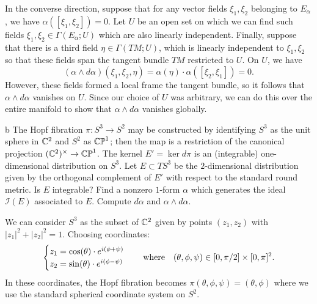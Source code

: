 \documentclass{../../templates/lkx_pset}
\begin{document}
\begin{parts}
	In the converse direction, suppose that for any vector fields $\xi_1,\xi_2$ belonging to $E_\alpha$, we have $\alpha([\xi_1,\xi_2])=0$. Let $U$ be an open set on which we can find such fields $\xi_1, \xi_2 \in \Gamma(E_\alpha; U)$ which are also linearly independent. Finally, suppose that there is a third field $\eta \in \Gamma(TM; U)$, which is linearly independent to $\xi_1, \xi_2$ so that these fields span the tangent bundle $TM$ restricted to $U$. On $U$, we have
	\[
		(\alpha\wedge d\alpha)(\xi_1, \xi_2,\eta) = \alpha(\eta)\cdot \alpha([\xi_2, \xi_1]) = 0.
	\]
	However, these fields formed a local frame the tangent bundle, so it follows that $\alpha\wedge d\alpha$ vanishes on $U$. Since our choice of $U$ was arbitrary, we can do this over the entire manifold to show that $\alpha\wedge d\alpha$ vanishes globally.

	\begin{part}{b}
		The Hopf fibration $\pi : S^3 \to S^2$ may be constructed by identifying $S^3$ as the unit sphere in $\mathbb{C}^2$ and $S^2$ as $\mathbb{CP}^1$; then the map is a restriction of the canonical projection $(\mathbb{C}^2)^\times \to \mathbb{CP}^1$. The kernel $E' = \ker d\pi$ is an (integrable) one-dimensional distribution on $S^3$. Let $E\subset TS^3$ be the $2$-dimensional distribution given by the orthogonal complement of $E'$ with respect to the standard round metric. Is $E$ integrable? Find a nonzero $1$-form $\alpha$ which generates the ideal $\mathcal{I}(E)$ associated to $E$. Compute $d\alpha$ and $\alpha\wedge d\alpha$.
	\end{part}

	We can consider $S^3$ as the subset of $\mathbb{C}^2$ given by points $(z_1, z_2)$ with $|z_1|^2 + |z_2|^2=1$. Choosing coordinates:
	\[
		\begin{cases} z_1 = \cos(\theta)\cdot e^{i(\phi + \psi)} \\ z_2 = \sin(\theta)\cdot e^{i(\phi - \psi)} \end{cases} \quad\textrm{where}\quad (\theta,\phi,\psi)\in [0,\pi/2]\times[0,\pi]^2.
	\]
	In these coordinates, the Hopf fibration becomes $\pi(\theta,\phi,\psi) = (\theta,\phi)$ where we use the standard spherical coordinate system on $S^2$.


\end{parts}
\end{document}
